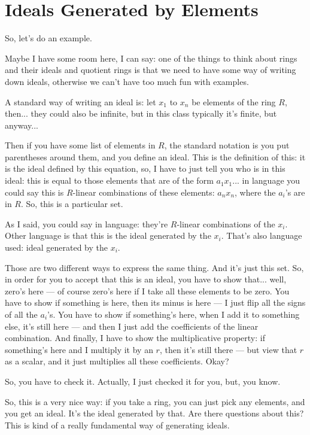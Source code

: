 \section{Ideals Generated by Elements}

\begin{speech}[01:10:37 - 01:12:08]
So, let's do an example.

Maybe I have some room here, I can say: one of the things to think about rings and their ideals and quotient rings is that we need to have some way of writing down ideals, otherwise we can't have too much fun with examples. 

A standard way of writing an ideal is: let $x_1$ to $x_n$ be elements of the ring $R$,  then... they could also be infinite, but in this class typically it's finite, but anyway...

Then if you have some list of elements in $R$, the standard notation is you put parentheses around them, and you define an ideal. This is the definition of this: it is the ideal defined by this equation,  so, I have to just tell you who is in this ideal: this is equal to those elements that are of the form $a_1 x_1$... in language you could say this is $R$-linear combinations of these elements: $a_n x_n$, where the $a_i$'s are in $R$.  So, this is a particular set.
\end{speech}

\begin{speech}[01:12:08 - 01:13:39]
As I said, you could say in language: they're $R$-linear combinations of the $x_i$.  Other language is that this is the ideal generated by the $x_i$. That's also language used: ideal generated by the $x_i$.  

Those are two different ways to express the same thing. And it's just this set. So, in order for you to accept that this is an ideal, you have to show that... well, zero's here --- of course zero's here if I take all these elements to be zero. You have to show if something is here, then its minus is here --- I just flip all the signs of all the $a_i$'s. You have to show if something's here, when I add it to something else, it's still here --- and then I just add the coefficients of the linear combination. And finally, I have to show the multiplicative property: if something's here and I multiply it by an $r$, then it's still there --- but view that $r$ as a scalar, and it just multiplies all these coefficients. Okay? 

So, you have to check it. Actually, I just checked it for you, but, you know. 

So, this is a very nice way: if you take a ring, you can just pick any elements, and you get an ideal. It's the ideal generated by that. Are there questions about this? This is kind of a really fundamental way of generating ideals.
\end{speech}

